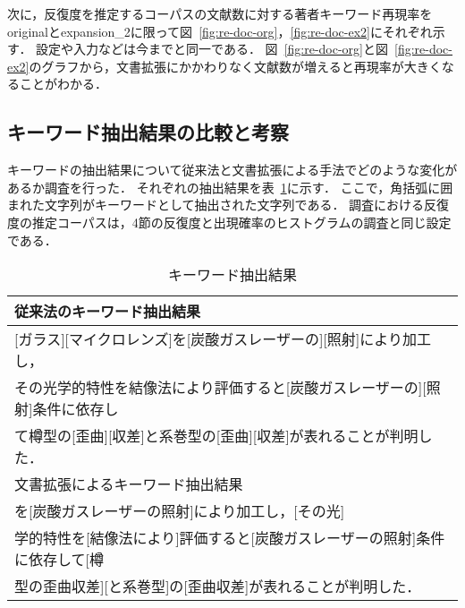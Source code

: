 \documentclass[japanese]{jnlp_1.2c}
\begin{document}
次に，反復度を推定するコーパスの文献数に対する著者キーワード再現率をoriginalとexpansion\_2に限って図~\ref{fig:re-doc-org}，\ref{fig:re-doc-ex2}にそれぞれ示す．
設定や入力などは今までと同一である．
図~\ref{fig:re-doc-org}と図~\ref{fig:re-doc-ex2}のグラフから，文書拡張にかかわりなく文献数が増えると再現率が大きくなることがわかる．

\subsection{キーワード抽出結果の比較と考察}
キーワードの抽出結果について従来法と文書拡張による手法でどのような変化があるか調査を行った．
それぞれの抽出結果を表~\ref{tab:out-key}に示す．
ここで，角括弧に囲まれた文字列がキーワードとして抽出された文字列である．
調査における反復度の推定コーパスは，4節の反復度と出現確率のヒストグラムの調査と同じ設定である．

\begin{table}[b]
	\caption[extraction]{キーワード抽出結果}
	\begin{center}
		\begin{tabular}{|l|} \hline		
			従来法のキーワード抽出結果 \\ \hline
			[クラウン][ガラス][マイクロレンズ]を[炭酸ガスレーザーの][照射]により加工し，\\
			その光学的特性を結像法により評価すると[炭酸ガスレーザーの][照射]条件に依存し\\
			て樽型の[歪曲][収差]と系巻型の[歪曲][収差]が表れることが判明した． \\ \hline
			文書拡張によるキーワード抽出結果 \\ \hline
			[クラウンガラスマイクロレンズ]を[炭酸ガスレーザーの照射]により加工し，[その光]\\
			学的特性を[結像法により]評価すると[炭酸ガスレーザーの照射]条件に依存して[樽\\
			型の歪曲収差][と系巻型]の[歪曲収差]が表れることが判明した． \\ \hline
		\end{tabular}
		\label{tab:out-key}
	\end{center}
\end{table}
\end{document}
